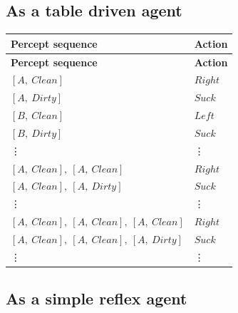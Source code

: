 \subsection{As a table driven agent}

\begin{customArrayStretch}{1.3}
\begin{longtable}{|l|l|}

\hline
\textbf{Percept sequence} & \textbf{Action} \\ \hline
\endhead

\hline
\textbf{Percept sequence} & \textbf{Action} \\ \hline
\endfirsthead

\hline\endfoot
\hline\endlastfoot


$[A, \ Clean]$ & $Right$ \\
$[A, \ Dirty]$ & $Suck$ \\
$[B, \ Clean]$ & $Left$ \\
$[B, \ Dirty]$ & $Suck$ \\

\vdots & \vdots \\

$[A, \ Clean],\ [A, \ Clean]$ & $Right$ \\
$[A, \ Clean],\ [A, \ Dirty]$ & $Suck$ \\

\vdots & \vdots \\

$[A, \ Clean],\ [A, \ Clean],\ [A, \ Clean]$ & $Right$ \\
$[A, \ Clean],\ [A, \ Clean],\ [A, \ Dirty]$ & $Suck$ \\

\vdots & \vdots \\

\end{longtable}
\end{customArrayStretch}





\subsection{As a simple reflex agent}

